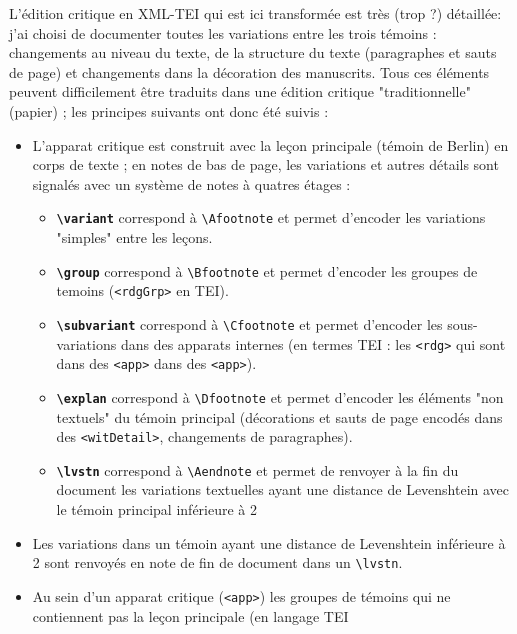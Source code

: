 \documentclass[12pt, a4paper]{article}
\begin{document}
	L'édition critique en XML-TEI qui est ici transformée est très (trop ?) 
	détaillée: j'ai choisi de documenter toutes les variations entre les trois 
	témoins : changements au niveau du texte, de la structure du texte 
	(paragraphes et sauts de page) et changements dans la décoration des 
	manuscrits. Tous ces éléments peuvent difficilement être traduits 
	dans une édition critique "traditionnelle" (papier) ; les principes 
	suivants ont donc été suivis :
	\begin{itemize}
		\item{L'apparat critique est construit avec la leçon principale (témoin de 
			Berlin) en corps de texte ; en notes de bas de page, les variations et 
			autres détails sont signalés avec un système de notes à quatres étages :}
		\begin{itemize}
			\item{\textbf{\texttt{\textbackslash variant}} correspond à 
				\texttt{\textbackslash Afootnote} et permet d'encoder les variations 
				"simples" entre les leçons.}
			\item{\textbf{\texttt{\textbackslash group}} correspond à 
				\texttt{\textbackslash Bfootnote} et permet d'encoder les groupes 
				de temoins (\texttt{<rdgGrp>} en TEI).}
			\item{\textbf{\texttt{\textbackslash subvariant}} correspond à 
				\texttt{\textbackslash Cfootnote} et permet d'encoder les sous-variations 
				dans des apparats internes (en termes TEI : les \texttt{<rdg>} 
				qui sont dans des \texttt{<app>} dans des \texttt{<app>}).}
			\item{\textbf{\texttt{\textbackslash explan}} correspond à 
				\texttt{\textbackslash Dfootnote} et permet d'encoder les éléments 
				"non textuels" du témoin principal (décorations et sauts de page 
				encodés dans des \texttt{<witDetail>}, changements de paragraphes).}
			\item{\textbf{\texttt{\textbackslash lvstn}} correspond à 
				\texttt{\textbackslash Aendnote} et permet de renvoyer à la fin du document
				les variations textuelles ayant une distance de Levenshtein avec le témoin
				principal inférieure à 2}
		\end{itemize}
		\item{Les variations dans un témoin ayant une distance de Levenshtein inférieure
			à 2 sont renvoyés en note de fin de document dans un 
			\texttt{\textbackslash lvstn}}.
		\item{Au sein d'un apparat critique (\texttt{<app>}) les groupes de 
			témoins qui ne contiennent pas la leçon principale (en langage TEI 
}
\end{itemize}
\end{document}
